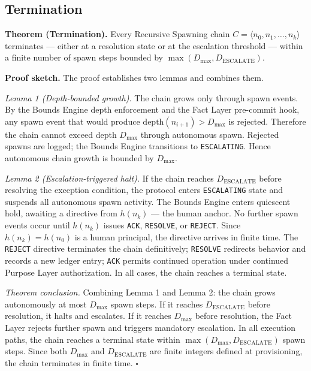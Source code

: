 \subsection{Termination}
\label{sec:rs-termination}

\medskip
\noindent\textbf{Theorem (Termination).} Every Recursive Spawning chain $C = \langle n_0, n_1, \ldots, n_k \rangle$ terminates — either at a resolution state or at the escalation threshold — within a finite number of spawn steps bounded by $\max(D_{\mathrm{max}}, D_{\mathrm{ESCALATE}})$.

\medskip
\noindent\textbf{Proof sketch.} The proof establishes two lemmas and combines them.

\medskip
\textit{Lemma 1 (Depth-bounded growth).} The chain grows only through spawn events. By the Bounds Engine depth enforcement and the Fact Layer pre-commit hook, any spawn event that would produce $\mathrm{depth}(n_{i+1}) > D_{\mathrm{max}}$ is rejected. Therefore the chain cannot exceed depth $D_{\mathrm{max}}$ through autonomous spawn. Rejected spawns are logged; the Bounds Engine transitions to \texttt{ESCALATING}. Hence autonomous chain growth is bounded by $D_{\mathrm{max}}$.

\medskip
\textit{Lemma 2 (Escalation-triggered halt).} If the chain reaches $D_{\mathrm{ESCALATE}}$ before resolving the exception condition, the protocol enters \texttt{ESCALATING} state and suspends all autonomous spawn activity. The Bounds Engine enters quiescent hold, awaiting a directive from $h(n_k)$ — the human anchor. No further spawn events occur until $h(n_k)$ issues \texttt{ACK}, \texttt{RESOLVE}, or \texttt{REJECT}. Since $h(n_k) = h(n_0)$ is a human principal, the directive arrives in finite time. The \texttt{REJECT} directive terminates the chain definitively; \texttt{RESOLVE} redirects behavior and records a new ledger entry; \texttt{ACK} permits continued operation under continued Purpose Layer authorization. In all cases, the chain reaches a terminal state.

\medskip
\textit{Theorem conclusion.} Combining Lemma 1 and Lemma 2: the chain grows autonomously at most $D_{\mathrm{max}}$ spawn steps. If it reaches $D_{\mathrm{ESCALATE}}$ before resolution, it halts and escalates. If it reaches $D_{\mathrm{max}}$ before resolution, the Fact Layer rejects further spawn and triggers mandatory escalation. In all execution paths, the chain reaches a terminal state within $\max(D_{\mathrm{max}}, D_{\mathrm{ESCALATE}})$ spawn steps. Since both $D_{\mathrm{max}}$ and $D_{\mathrm{ESCALATE}}$ are finite integers defined at provisioning, the chain terminates in finite time. $\square$

